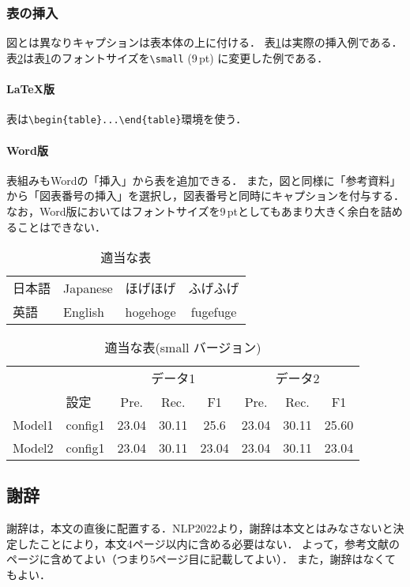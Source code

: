 \documentclass[
  platex, dvipdfmx,  %
]{nlp2024}
\begin{document}
\subsubsection{表の挿入}
図とは異なりキャプションは表本体の上に付ける．
表\ref{tab:sample1}は実際の挿入例である．
表\ref{tab:sample2}は表\ref{tab:sample1}のフォントサイズを\verb|\small| (9\,pt) に変更した例である．



\paragraph{LaTeX版}
表は\verb|\begin{table}...\end{table}|環境を使う．

\paragraph{Word版}
表組みもWordの「挿入」から表を追加できる．
また，図と同様に「参考資料」から「図表番号の挿入」を選択し，図表番号と同時にキャプションを付与する．
なお，Word版においてはフォントサイズを9\,ptとしてもあまり大きく余白を詰めることはできない．

\begin{table}[t]
\centering
\caption{適当な表}
\label{tab:sample1}
\begin{tabular}{llcc}
\hline
日本語 & Japanese & ほげほげ & ふげふげ\\
英語 & English & hogehoge & fugefuge\\
\hline
\end{tabular}
\end{table}
%
\begin{table}[t]
\centering
\small
\tabcolsep 3pt
\caption{適当な表(small バージョン)}
\label{tab:sample2}
\begin{tabular}{llcccccc}
\hline
\      &      &\multicolumn{3}{c}{データ1}&\multicolumn{3}{c}{データ2}\\
\      & 設定 & Pre. & Rec. &F1 & Pre. & Rec. &F1\\
\hline
Model1 & config1 & 23.04 & 30.11 &  25.6 & 23.04 & 30.11 &  25.60\\
Model2 & config1 & 23.04 & 30.11 & 23.04 & 23.04 & 30.11 & 23.04 \\
\hline
\end{tabular}
\end{table}




\subsection{謝辞}
謝辞は，本文の直後に配置する．NLP2022より，謝辞は本文とはみなさないと決定したことにより，本文4ページ以内に含める必要はない．
よって，参考文献のページに含めてよい（つまり5ページ目に記載してよい）．
また，謝辞はなくてもよい．
\end{document}
